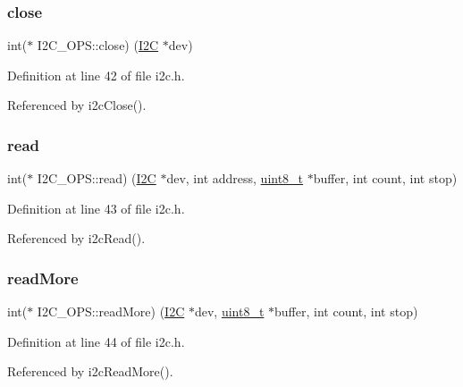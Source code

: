 \subsubsection{\texorpdfstring{close}{close}}
{\footnotesize\ttfamily int($\ast$ I2\+C\+\_\+\+O\+P\+S\+::close) (\mbox{\hyperlink{structI2C}{I2C}} $\ast$dev)}



Definition at line 42 of file i2c.\+h.



Referenced by i2c\+Close().

\mbox{\label{structI2C__OPS_a2ff14bf2b2b01d2c4f5b4e802322dc57}} 
\subsubsection{\texorpdfstring{read}{read}}
{\footnotesize\ttfamily int($\ast$ I2\+C\+\_\+\+O\+P\+S\+::read) (\mbox{\hyperlink{structI2C}{I2C}} $\ast$dev, int address, \mbox{\hyperlink{stdint_8h_aba7bc1797add20fe3efdf37ced1182c5}{uint8\+\_\+t}} $\ast$buffer, int count, int stop)}



Definition at line 43 of file i2c.\+h.



Referenced by i2c\+Read().

\mbox{\label{structI2C__OPS_a6ce358dfa4de1e4ee92ad5ba68c1e7b9}} 
\subsubsection{\texorpdfstring{readMore}{readMore}}
{\footnotesize\ttfamily int($\ast$ I2\+C\+\_\+\+O\+P\+S\+::read\+More) (\mbox{\hyperlink{structI2C}{I2C}} $\ast$dev, \mbox{\hyperlink{stdint_8h_aba7bc1797add20fe3efdf37ced1182c5}{uint8\+\_\+t}} $\ast$buffer, int count, int stop)}



Definition at line 44 of file i2c.\+h.



Referenced by i2c\+Read\+More().

\mbox{\label{structI2C__OPS_a930089cdac6e57badc81887655a5d53d}} 
